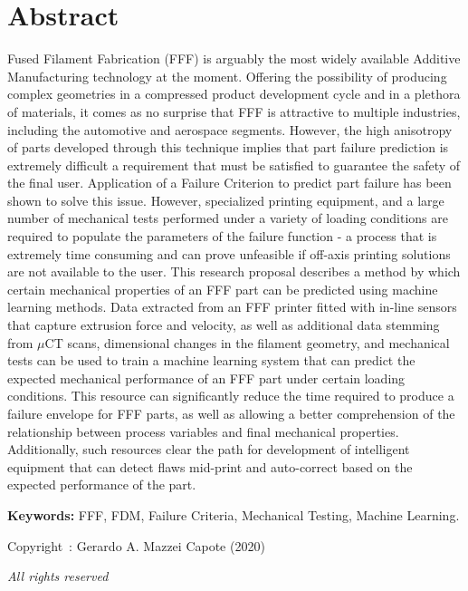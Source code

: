 \documentclass[main.tex]{subfiles}
\begin{document}
\setcounter{page}{1}
\chapter*{Abstract}
Fused Filament Fabrication (FFF) is arguably the most widely available Additive Manufacturing technology at the moment. Offering the possibility of producing complex geometries in a compressed product development cycle and in a plethora of materials, it comes as no surprise that FFF is attractive to multiple industries, including the automotive and aerospace segments. However, the high anisotropy of parts developed through this technique implies that part failure prediction is extremely difficult \textemdash a requirement that must be satisfied to guarantee the safety of the final user. Application of a Failure Criterion to predict part failure has been shown to solve this issue. However, specialized printing equipment, and a large number of mechanical tests performed under a variety of loading conditions are required to populate the parameters of the failure function - a process that is extremely time consuming and can prove unfeasible if off-axis printing solutions are not available to the user. This research proposal describes a method by which certain mechanical properties of an FFF part can be predicted using machine learning methods. Data extracted from an FFF printer fitted with in-line sensors that capture extrusion force and velocity, as well as additional data stemming from $\mu$CT scans, dimensional changes in the filament geometry, and mechanical tests can be used to train a machine learning system that can predict the expected mechanical performance of an FFF part under certain loading conditions. This resource can significantly reduce the time required to produce a failure envelope for FFF parts, as well as allowing a better comprehension of the relationship between process variables and final mechanical properties. Additionally, such resources clear the path for development of intelligent equipment that can detect flaws mid-print and auto-correct based on the expected performance of the part.  
 
\vspace{10mm} %
\textbf{Keywords:} FFF, FDM, Failure Criteria, Mechanical Testing, Machine Learning.

\vfill %
\begin{center}
Copyright~\textcopyright: Gerardo A. Mazzei Capote (2020)

\emph{All rights reserved}	
\end{center}
\end{document}
